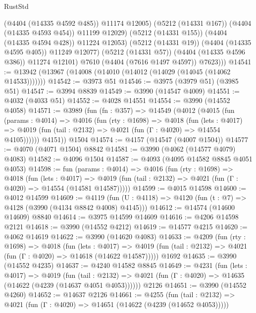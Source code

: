 \begin{lexlean}{RustStd}
\begin{coremodule}
{\begin{coremodule}
{{{{{{{{{{{{{{{{                    (@4404 (@14335 @4592 @485))
                    @11174
                    @12005)
                  (@5212 (@14331 @167))
                  (@4404 (@14335 @4593 @454))
                  @11199
                  @12029)
                (@5212 (@14331 @155))
                (@4404 (@14335 @4594 @428))
                @11224
                @12053)
              (@5212 (@14331 @19))
              (@4404 (@14335 @4595 @405))
              @11249
              @12077)
            (@5212 (@14331 @57))
            (@4404 (@14335 @4596 @386))
            @11274
            @12101)
          @7610
          (@4404 (@7616 @1497 @4597))
          @7623)))
@14541 := @13942 (@13967 (@14008 (@14010 (@14012 (@14029 (@14045 (@14062 @14533)))))))
@14542 := @3973 @51
@14546 := @3975 (@3979 @51) (@3985 @51)
@14547 := @3994 @8839
@14549 := @3990 (@14547 @4009)
@14551 := @4032 (@4033 @51)
@14552 := @4028 @14551
@14554 := @3990 (@14552 @4058)
@14571 := @3989
    (fun (fn : @357) =>
    @14549
      (@4012
        (@4015
          (fun (params : @4014) =>
          @4016
            (fun (rty : @1698) =>
            @4018
              (fun (lets : @4017) =>
              @4019 (fun (tail : @2132) => @4021 (fun (Γ : @4020) => @14554 @4105))))))
        @4151))
    @1504
@14574 := @4157 (@14547 (@4007 @1504))
@14577 := @4070 (@4071 @1504) @8842
@14581 := @3990 (@4062 (@14577 @4079) @4083)
@14582 := @4096 @1504
@14587 := @4093 (@4095 @14582 @8845 @4051 @4053)
@14598 := fun (params : @4014) =>
  @4016
    (fun (rty : @1698) =>
    @4018
      (fun (lets : @4017) =>
      @4019 (fun (tail : @2132) => @4021 (fun (Γ : @4020) => @14554 (@14581 @14587)))))
@14599 := @4015 @14598
@14600 := @4012 @14599
@14609 := @4119 (fun (U : @4118) => @4120 (fun (t : @7) => @4128 (@3990 (@4134 @8842 @4008) @4145)))
@14612 := @14574 (@14600 @14609) @8840
@14614 := @3975 @14599 @14609
@14616 := @4206 @14598 @2121
@14618 := @3990 (@14552 @4212)
@14619 := @14577 @4215
@14620 := @4062 @14619
@14622 := @3990 (@14620 @4083)
@14633 := @4209
    (fun (rty : @1698) =>
    @4018
      (fun (lets : @4017) =>
      @4019 (fun (tail : @2132) => @4021 (fun (Γ : @4020) => @14618 (@14622 @14587)))))
    @1692
@14635 := @3990 (@14552 @4235)
@14637 := @4240 @14582 @8845
@14649 := @4231
    (fun (lets : @4017) =>
    @4019
      (fun (tail : @2132) =>
      @4021 (fun (Γ : @4020) => @14635 (@14622 (@4239 (@14637 @4051 @4053))))))
    @2126
@14651 := @3990 (@14552 @4260)
@14652 := @14637 @2126
@14661 := @4255
    (fun (tail : @2132) => @4021 (fun (Γ : @4020) => @14651 (@14622 (@4239 (@14652 @4053)))))
}}}}}}}}}}}}}}}}
\end{coremodule}}
\end{coremodule}
\end{lexlean}

